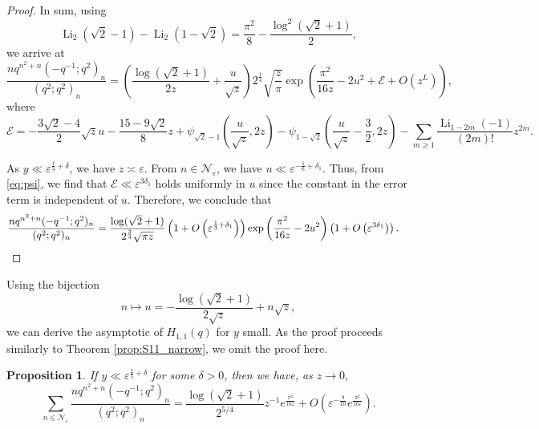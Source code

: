 \documentclass[11pt,reqno]{amsart}
\newtheorem{proposition}[theorem]{Proposition}
\theoremstyle{remark}
\numberwithin{equation}{section}
\def\Li{\operatorname{Li}}
\def\Li{\operatorname{Li}}
\begin{document}
\begin{proof}
In sum, using \cite[eq. (11)]{L}
\[
	 \Li_2 (\sqrt{2}-1) -\Li_2 (1-\sqrt{2}) = \frac{\pi^2}{8} - \frac{\log^2 (\sqrt{2}+1)}{2},
\]
we arrive at
\[
	\frac{ n q^{n^2+n} (-q^{-1};q^2)_n}{(q^2;q^2)_n}
	=\left( \frac{\log (\sqrt{2}+1)}{2z} + \frac{u}{\sqrt{z}}  \right)  2^{\frac14}\sqrt{\frac{z}{\pi}}  \exp\left(  \frac{\pi^2}{16z} -2u^2 + \mathcal{E} + O\left(z^L\right) \right),
\]
where 
\[
	\mathcal{E}=-\frac{3\sqrt{2}-4}{2}\sqrt{z}u -\frac{15-9\sqrt{2}}{8}z + \psi_{\sqrt{2}-1} \left(\frac{u}{\sqrt{z}}, 2z \right)
	- \psi_{1-\sqrt{2}} \left(\frac{u}{\sqrt{z}}-\frac32, 2z \right)
	-\sum_{m \geq 1} \frac{\Li_{1-2m}(-1)}{(2m)!} z^{2m}.
\]


As $y \ll \varepsilon^{\frac13+\delta}$, we have $z \asymp \varepsilon$. From $n \in \mathcal{N}_{\varepsilon}$, we have $u \ll \varepsilon^{-\frac16+\delta_1}$. Thus, from \eqref{eq:psi}, we find that $\mathcal{E} \ll \varepsilon^{3\delta_1}$ holds uniformly in $u$ since the constant in the error term is independent of $u$.
Therefore, we conclude that
\begin{align*}
	\frac{ n q^{n^2+n} (-q^{-1};q^2)_n}{(q^2;q^2)_n}
	&= \frac{\log(\sqrt{2}+1) }{2^{\frac34}\sqrt{\pi z}}\left( 1 + O\left(\varepsilon^{\frac13+\delta_1}\right) \right) 
	\exp\left(  \frac{\pi^2}{16z} -2u^2\right) \left(1+O\left(\varepsilon^{3\delta_1}\right)\right). \qedhere
\end{align*}
\end{proof}

Using the bijection
\[
	 n \mapsto u = - \frac{\log (\sqrt{2}+1)}{2\sqrt{z}} + n\sqrt{z},
\]
we can  derive the asymptotic of $H_{1,1}(q)$ for $y$ small. As the proof proceeds similarly to Theorem \ref{prop:S11_narrow}, we omit the proof here.

\begin{proposition}\label{prop:H11_narrow}
	If $y \ll \varepsilon^{\frac{2}{5}+\delta}$ for some $\delta>0$, then we have, as $z \to 0$, 
	\[
		\sum_{n \in \mathcal{N}_{\varepsilon}} \frac{ n q^{n^2+n} (-q^{-1};q^2)_n}{(q^2;q^2)_n} = \frac{\log(\sqrt{2}+1) }{2^{5/4}}  z^{-1} e^{\frac{\pi^2}{16 z}} + O\left(\varepsilon^{-\frac{9}{10}} e^{\frac{\pi^2}{16\varepsilon}}\right).
	\]
\end{proposition}
\end{document}
